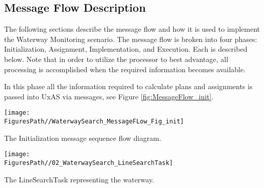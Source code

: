 \subsection{Message Flow Description}
The following sections describe the message flow and how it is used to implement the Waterway Monitoring scenario. The message flow is broken into four phases: Initialization, Assignment, Implementation, and Execution. Each is described below. Note that in order to utilize the processor to best advantage, all processing is accomplished when the required information becomes available.


In this phase all the information required to calculate plans and assignments is passed into UxAS via messages, see Figure \ref{fig:MessageFlow_init}.
\begin{marginfigure}
	\texttt{[image: \\FiguresPath//WaterwaySearch\_MessageFLow\_Fig\_init]}
	\caption{The Initialization message sequence flow diagram.}
	\label{fig:MessageFlow_init}
\end{marginfigure}

\begin{marginfigure}[180pt]
	\texttt{[image: \\FiguresPath//02\_WaterwaySearch\_LineSearchTask]}
	\caption{The LineSearchTask representing the waterway.}
	\label{fig:lineSearchTask}
\end{marginfigure}

